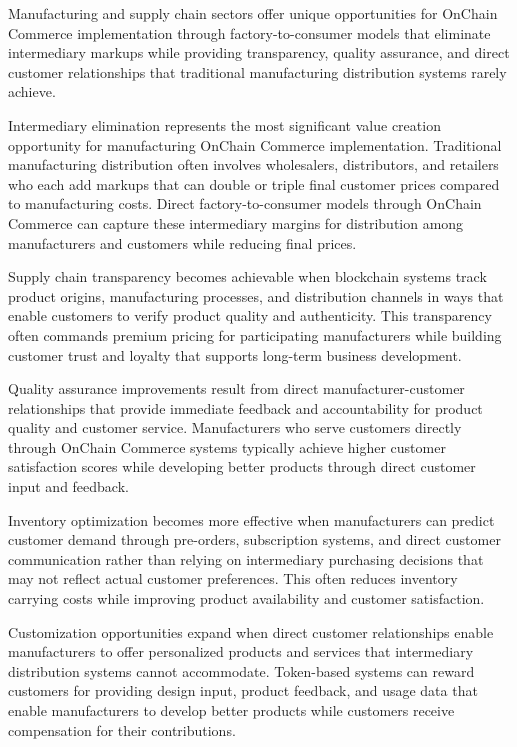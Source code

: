 \documentclass[
  Letterpaper,
]{scrbook}
\begin{document}
Manufacturing and supply chain sectors offer unique opportunities for
OnChain Commerce implementation through factory-to-consumer models that
eliminate intermediary markups while providing transparency, quality
assurance, and direct customer relationships that traditional
manufacturing distribution systems rarely achieve.

Intermediary elimination represents the most significant value creation
opportunity for manufacturing OnChain Commerce implementation.
Traditional manufacturing distribution often involves wholesalers,
distributors, and retailers who each add markups that can double or
triple final customer prices compared to manufacturing costs. Direct
factory-to-consumer models through OnChain Commerce can capture these
intermediary margins for distribution among manufacturers and customers
while reducing final prices.

Supply chain transparency becomes achievable when blockchain systems
track product origins, manufacturing processes, and distribution
channels in ways that enable customers to verify product quality and
authenticity. This transparency often commands premium pricing for
participating manufacturers while building customer trust and loyalty
that supports long-term business development.

Quality assurance improvements result from direct manufacturer-customer
relationships that provide immediate feedback and accountability for
product quality and customer service. Manufacturers who serve customers
directly through OnChain Commerce systems typically achieve higher
customer satisfaction scores while developing better products through
direct customer input and feedback.

Inventory optimization becomes more effective when manufacturers can
predict customer demand through pre-orders, subscription systems, and
direct customer communication rather than relying on intermediary
purchasing decisions that may not reflect actual customer preferences.
This often reduces inventory carrying costs while improving product
availability and customer satisfaction.

Customization opportunities expand when direct customer relationships
enable manufacturers to offer personalized products and services that
intermediary distribution systems cannot accommodate. Token-based
systems can reward customers for providing design input, product
feedback, and usage data that enable manufacturers to develop better
products while customers receive compensation for their contributions.
\end{document}
